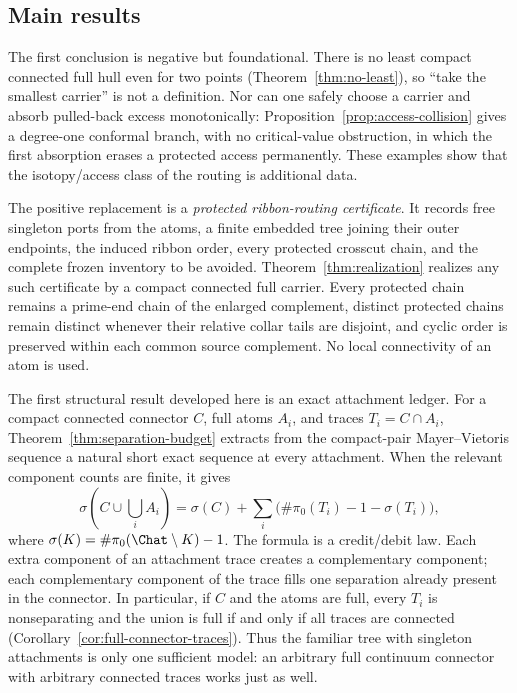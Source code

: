 \subsection{Main results}

The first conclusion is negative but foundational.  There is no least
compact connected full hull even for two points
(Theorem~\ref{thm:no-least}), so ``take the smallest carrier'' is not a
definition.  Nor can one safely choose a carrier and absorb pulled-back
excess monotonically: Proposition~\ref{prop:access-collision} gives a
degree-one conformal branch, with no critical-value obstruction, in which
the first absorption erases a protected access permanently.  These examples
show that the isotopy/access class of the routing is additional data.

The positive replacement is a \emph{protected ribbon-routing certificate}.
It records free singleton ports from the atoms, a finite embedded tree
joining their outer endpoints, the induced ribbon order, every protected
crosscut chain, and the complete frozen inventory to be avoided.
Theorem~\ref{thm:realization} realizes any such certificate by a compact
connected full carrier.  Every protected chain remains a prime-end chain of
the enlarged complement, distinct protected chains remain distinct whenever
their relative collar tails are disjoint, and cyclic order is preserved
within each common source complement.  No local connectivity of an atom is
used.

The first structural result developed here is an exact attachment ledger.
For a compact connected connector $C$, full atoms $A_i$, and traces
$T_i=C\cap A_i$, Theorem~\ref{thm:separation-budget} extracts from the
compact-pair Mayer--Vietoris sequence a natural short exact sequence at
every attachment.  When the relevant component counts are finite, it gives
\[
 \sigma\!\left(C\cup\bigcup_iA_i\right)
 =
 \sigma(C)+
 \sum_i\bigl(\#\pi_0(T_i)-1-\sigma(T_i)\bigr),
\]
where $\sigma(K)=\#\pi_0(\Chat\setminus K)-1$.  The formula is a
credit/debit law.  Each extra component of an attachment trace creates a
complementary component; each complementary component of the trace fills
one separation already present in the connector.  In particular, if $C$
and the atoms are full, every $T_i$ is nonseparating and the union is full
if and only if all traces are connected
(Corollary~\ref{cor:full-connector-traces}).  Thus the familiar tree with
singleton attachments is only one sufficient model: an arbitrary full
continuum connector with arbitrary connected traces works just as well.

